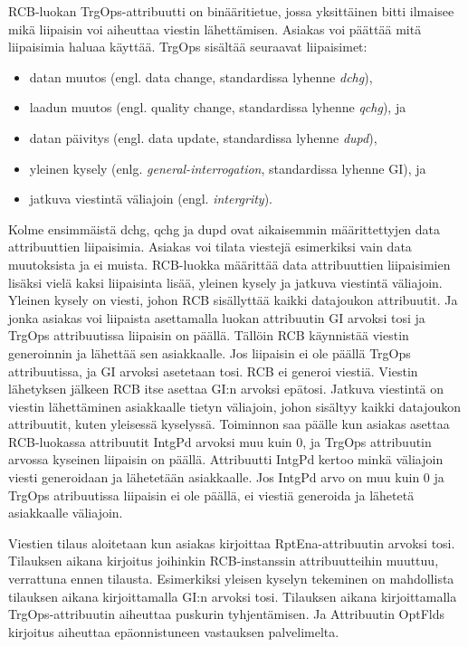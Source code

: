 RCB-luokan TrgOps-attribuutti on binääritietue, jossa yksittäinen bitti ilmaisee mikä liipaisin voi aiheuttaa viestin lähettämisen. Asiakas voi päättää mitä liipaisimia haluaa käyttää. TrgOps sisältää seuraavat liipaisimet:
\begin{itemize}
	\item datan muutos (engl. data change, standardissa lyhenne \emph{dchg}),
	\item laadun muutos (engl. quality change, standardissa lyhenne \emph{qchg}), ja
	\item datan päivitys (engl. data update, standardissa lyhenne \emph{dupd}),
	\item yleinen kysely (enlg. \emph{general-interrogation}, standardissa lyhenne GI), ja 
	\item jatkuva viestintä väliajoin (engl. \emph{intergrity}).
\end{itemize}

Kolme ensimmäistä dchg, qchg ja dupd ovat aikaisemmin määrittettyjen data attribuuttien liipaisimia. Asiakas voi tilata viestejä esimerkiksi vain data muutoksista ja ei muista. RCB-luokka määrittää data attribuuttien liipaisimien lisäksi vielä kaksi liipaisinta lisää, yleinen kysely ja jatkuva viestintä väliajoin. Yleinen kysely on viesti, johon RCB sisällyttää kaikki datajoukon attribuutit. Ja jonka asiakas voi liipaista asettamalla luokan attribuutin GI arvoksi tosi ja TrgOps attribuutissa liipaisin on päällä. Tällöin RCB käynnistää viestin generoinnin ja lähettää sen asiakkaalle. Jos liipaisin ei ole päällä TrgOps attribuutissa, ja GI arvoksi asetetaan tosi. RCB ei generoi viestiä. Viestin lähetyksen jälkeen RCB itse asettaa GI:n arvoksi epätosi. Jatkuva viestintä on viestin lähettäminen asiakkaalle tietyn väliajoin, johon sisältyy kaikki datajoukon attribuutit, kuten yleisessä kyselyssä. Toiminnon saa päälle kun asiakas asettaa RCB-luokassa attribuutit IntgPd arvoksi muu kuin 0, ja TrgOps attribuutin arvossa kyseinen liipaisin on päällä. Attribuutti IntgPd kertoo minkä väliajoin viesti generoidaan ja lähetetään asiakkaalle. Jos IntgPd arvo on muu kuin 0 ja TrgOps atribuutissa liipaisin ei ole päällä, ei viestiä generoida ja lähetetä asiakkaalle väliajoin.

Viestien tilaus aloitetaan kun asiakas kirjoittaa RptEna-attribuutin arvoksi tosi. Tilauksen aikana kirjoitus joihinkin RCB-instanssin attribuutteihin muuttuu, verrattuna ennen tilausta. Esimerkiksi yleisen kyselyn tekeminen on mahdollista tilauksen aikana kirjoittamalla GI:n arvoksi tosi. Tilauksen aikana kirjoittamalla TrgOps-attribuutin aiheuttaa puskurin tyhjentämisen. Ja Attribuutin OptFlds kirjoitus aiheuttaa epäonnistuneen vastauksen palvelimelta.

